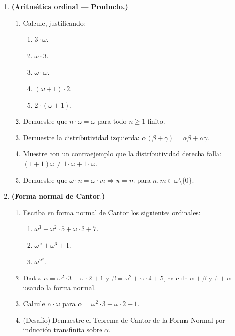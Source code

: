 \begin{enumerate}[leftmargin=2.5em, label=\textbf{\arabic*.}]
  \item \textbf{(Aritmética ordinal — Producto.)}
  \begin{enumerate}[label=(\alph*)]
    \item Calcule, justificando:
    \begin{enumerate}[label=(\roman*)]
      \item $3 \cdot \omega$.
      \item $\omega \cdot 3$.
      \item $\omega \cdot \omega$.
      \item $(\omega + 1) \cdot 2$.
      \item $2 \cdot (\omega + 1)$.
    \end{enumerate}
    \item Demuestre que $n \cdot \omega = \omega$ para todo $n \geq 1$ finito.
    \item Demuestre la distributividad izquierda: $\alpha(\beta + \gamma) = \alpha\beta + \alpha\gamma$.
    \item Muestre con un contraejemplo que la distributividad derecha falla: $(1+1)\omega \neq 1\cdot\omega + 1\cdot\omega$.
    \item Demuestre que $\omega \cdot n = \omega \cdot m \Rightarrow n = m$ para $n, m \in \omega \setminus \{0\}$.
  \end{enumerate}

  \item \textbf{(Forma normal de Cantor.)}
  \begin{enumerate}[label=(\alph*)]
    \item Escriba en forma normal de Cantor los siguientes ordinales:
    \begin{enumerate}[label=(\roman*)]
      \item $\omega^3 + \omega^2 \cdot 5 + \omega \cdot 3 + 7$.
      \item $\omega^\omega + \omega^3 + 1$.
      \item $\omega^{\omega^2}$.
    \end{enumerate}
    \item Dados $\alpha = \omega^2 \cdot 3 + \omega \cdot 2 + 1$ y $\beta = \omega^2 + \omega \cdot 4 + 5$, calcule $\alpha + \beta$ y $\beta + \alpha$ usando la forma normal.
    \item Calcule $\alpha \cdot \omega$ para $\alpha = \omega^2 \cdot 3 + \omega \cdot 2 + 1$.
    \item (Desafío) Demuestre el Teorema de Cantor de la Forma Normal por inducción transfinita sobre $\alpha$.
  \end{enumerate}


\end{enumerate}
